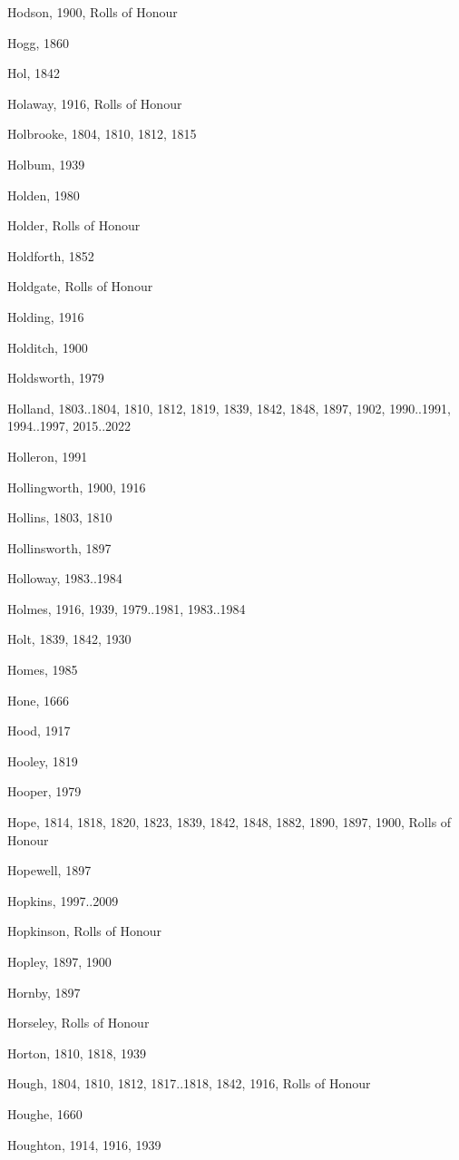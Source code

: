\begin{theindex}
\item Hodson, 1900, Rolls of Honour
\item Hogg, 1860
\item Hol, 1842
\item Holaway, 1916, Rolls of Honour
\item Holbrooke, 1804, 1810, 1812, 1815
\item Holbum, 1939
\item Holden, 1980
\item Holder, Rolls of Honour
\item Holdforth, 1852
\item Holdgate, Rolls of Honour
\item Holding, 1916
\item Holditch, 1900
\item Holdsworth, 1979
\item Holland, 1803..1804, 1810, 1812, 1819, 1839, 1842, 1848, 1897, 1902, 1990..1991, 1994..1997, 2015..2022
\item Holleron, 1991
\item Hollingworth, 1900, 1916
\item Hollins, 1803, 1810
\item Hollinsworth, 1897
\item Holloway, 1983..1984
\item Holmes, 1916, 1939, 1979..1981, 1983..1984
\item Holt, 1839, 1842, 1930
\item Homes, 1985
\item Hone, 1666
\item Hood, 1917
\item Hooley, 1819
\item Hooper, 1979
\item Hope, 1814, 1818, 1820, 1823, 1839, 1842, 1848, 1882, 1890, 1897, 1900, Rolls of Honour
\item Hopewell, 1897
\item Hopkins, 1997..2009
\item Hopkinson, Rolls of Honour
\item Hopley, 1897, 1900
\item Hornby, 1897
\item Horseley, Rolls of Honour
\item Horton, 1810, 1818, 1939
\item Hough, 1804, 1810, 1812, 1817..1818, 1842, 1916, Rolls of Honour
\item Houghe, 1660
\item Houghton, 1914, 1916, 1939

\end{theindex}
